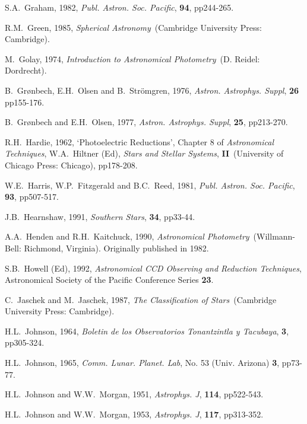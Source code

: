 \documentclass[twoside,11pt,nolof]{starlink}
\begin{document}
\begin{thebibliography}{99}
   S.A.~Graham, 1982, \textit{Publ. Astron.
   Soc. Pacific}, \textbf{94}, pp244-265.

   R.M.~Green, 1985, \textit{Spherical Astronomy}\,
   (Cambridge University Press: Cambridge).

   M.~Golay, 1974, \textit{Introduction to Astronomical
   Photometry}\, (D. Reidel: Dordrecht).

   B.~Gr\o nbech, E.H.~Olsen and B.~Str\"{o}mgren,
   1976, \textit{Astron. Astrophys. Suppl}, \textbf{26} pp155-176.

   B.~Gr\o nbech and E.H.~Olsen, 1977, \textit{Astron. Astrophys. Suppl}, \textbf{25}, pp213-270.

   R.H.~Hardie, 1962, `Photoelectric Reductions',
   Chapter 8 of \textit{Astronomical Techniques}, W.A.~Hiltner (Ed), \textit{Stars and Stellar Systems}, \textbf{II}\, (University of Chicago Press:
   Chicago), pp178-208.

   W.E.~Harris, W.P.~Fitzgerald and B.C.~Reed, 1981,
   \textit{Publ. Astron. Soc. Pacific}, \textbf{93}, pp507-517.

   J.B.~Hearnshaw, 1991, \textit{Southern Stars},
   \textbf{34}, pp33-44.

   A.A.~Henden and R.H.~Kaitchuck, 1990, \textit{Astronomical Photometry}\, (Willmann-Bell: Richmond, Virginia).
   Originally published in 1982.

   S.B.~Howell (Ed), 1992, \textit{Astronomical CCD
   Observing and Reduction Techniques}, Astronomical Society of the
   Pacific Conference Series \textbf{23}.

   C.~Jaschek and M.~Jaschek, 1987, \textit{The
  Classification of Stars}\, (Cambridge University Press: Cambridge).

   H.L.~Johnson, 1964, \textit{Boletin de los
   Observatorios Tonantzintla y Tacubaya}, \textbf{3}, pp305-324.

   H.L.~Johnson, 1965, \textit{Comm. Lunar. Planet.
   Lab}, No. 53 (Univ. Arizona) \textbf{3}, pp73-77.

   H.L.~Johnson and W.W.~Morgan, 1951, \textit{Astrophys. J}, \textbf{114}, pp522-543.

   H.L.~Johnson and W.W.~Morgan, 1953, \textit{Astrophys. J}, \textbf{117}, pp313-352.


\end{thebibliography}
\end{document}
